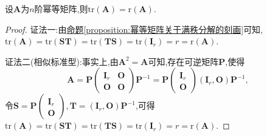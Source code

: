 \documentclass[../../main.tex]{subfiles}
\begin{document}
\begin{corollary}[幂等矩阵的迹和秩相等]\label{corollary:幂等矩阵的迹和秩相等}
设\(\boldsymbol{A}\)为\(n\)阶幂等矩阵,则\(\mathrm{tr}(\boldsymbol{A})=\mathrm{r}(\boldsymbol{A})\).
\end{corollary}
\begin{proof}
{\color{blue}证法一:}由\hyperref[proposition:幂等矩阵关于满秩分解的刻画]{命题\ref{proposition:幂等矩阵关于满秩分解的刻画}}可知,\(\mathrm{tr}(\boldsymbol{A})=\mathrm{tr}(\boldsymbol{S}\boldsymbol{T})=\mathrm{tr}(\boldsymbol{T}\boldsymbol{S})=\mathrm{tr}(\boldsymbol{I}_r)=r=\mathrm{r}(\boldsymbol{A})\).

{\color{blue}证法二(相似标准型):}事实上,由\(\boldsymbol{A}^2=\boldsymbol{A}\)可知,存在可逆矩阵\(\boldsymbol{P}\),使得
\[
\boldsymbol{A}=\boldsymbol{P}\begin{pmatrix}
\boldsymbol{I}_r&\boldsymbol{O}\\
\boldsymbol{O}&\boldsymbol{O}
\end{pmatrix}\boldsymbol{P}^{-1}=\boldsymbol{P}\begin{pmatrix}
\boldsymbol{I}_r\\
\boldsymbol{O}
\end{pmatrix}(\boldsymbol{I}_r,\boldsymbol{O})\boldsymbol{P}^{-1},
\]
令\(\boldsymbol{S}=\boldsymbol{P}\begin{pmatrix}
\boldsymbol{I}_r\\
\boldsymbol{O}
\end{pmatrix},\boldsymbol{T}=(\boldsymbol{I}_r,\boldsymbol{O})\boldsymbol{P}^{-1}\),可得\(\mathrm{tr}(\boldsymbol{A})=\mathrm{tr}(\boldsymbol{S}\boldsymbol{T})=\mathrm{tr}(\boldsymbol{T}\boldsymbol{S})=\mathrm{tr}(\boldsymbol{I}_r)=r=\mathrm{r}(\boldsymbol{A})\).
\end{proof}
\end{document}
